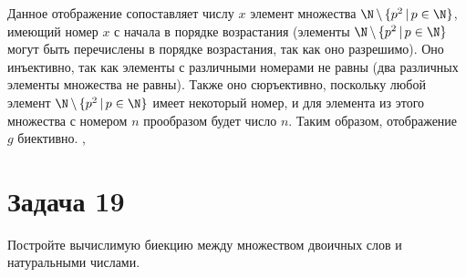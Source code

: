 \documentclass[a4paper,12pt]{article}
\begin{document}
	Данное отображение сопоставляет числу $x$ элемент множества $\N\,\backslash\,\{p^2\,|\,p\in\N\}$, имеющий номер $x$ с начала в порядке возрастания (элементы $\N\,\backslash\,\{p^2\,|\,p\in\N\}$ могут быть перечислены в порядке возрастания, так как оно разрешимо). Оно инъективно, так как элементы с различными номерами не равны (два различных элементы множества не равны). Также оно сюръективно, поскольку любой элемент $\N\,\backslash\,\{p^2\,|\,p\in\N\}$ имеет некоторый номер, и для элемента из этого множества с номером $n$ прообразом будет число $n$. Таким образом, отображение $g$ биективно.
	\sep	
	
	\begin{comment}
	\section*{Задача 18}
    Постройте вычислимую биекцию между множествами $\N$ и $\N\,\backslash\,\{p^2\,|\,p\in\N\}$.
	\subsection*{Решение}
    Поскольку множество $\N\,\backslash\,\{p^2\,|\,p\in\N\}$ разрешимо, его элементы могут быть перечислены в порядке возрастания (для этого перечисляющему алгоритму нужно последовательно идти по натуральным числам, начиная с 0, и, если текущее число входит в $\N\,\backslash\,\{p^2\,|\,p\in\N\}$, выводить его). Следовательно, элементы $\N\,\backslash\,\{p^2\,|\,p\in\N\}$ могут быть пронумерованы натуральными числами. Тогда можно задать следующее отображение $f: \N\to\N\,\backslash\,\{p^2\,|\,p\in\N\}$: элементу $x\in\N$ сопоставляется элемент $\N\,\backslash\,\{p^2\,|\,p\in\N\}$ с номером $n$. Это отображение инъективно, так как элементы с различными номерами не равны (два различных элементы множества не равны). Также оно сюръективно, поскольку любой элемент $\N\,\backslash\,\{p^2\,|\,p\in\N\}$ имеет некоторый номер, и для элемента из этого множества с номером $n$ прообразом будет число $n$. Таким образом, отображение $g$ биективно.
    
	\sep
	
    \end{comment}
	
	\section*{Задача 19}
	Постройте вычислимую биекцию между множеством двоичных слов и натуральными числами.
\end{document}
